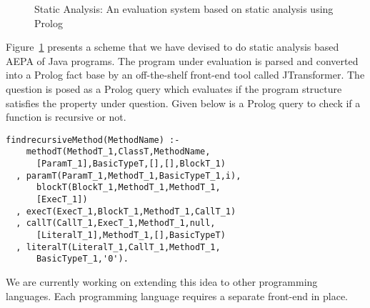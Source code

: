 \documentclass[12pt]{article}
\begin{document}
\begin{figure}

\begin{center}
\end{center}
\caption{Static Analysis: An evaluation system based on static analysis using Prolog}
\label{f:jtsa}
\end{figure}

Figure~\ref{f:jtsa} presents a scheme that we have devised to do static analysis based AEPA of Java programs. The program under evaluation is parsed and converted into a Prolog fact base by an off-the-shelf front-end tool called JTransformer. The question is posed as a Prolog query which evaluates if the program structure satisfies the property under question. Given below is a Prolog query to check if a function is recursive or not.

\begin{lstlisting}[style=pc]
findrecursiveMethod(MethodName) :-   
    methodT(MethodT_1,ClassT,MethodName,
      [ParamT_1],BasicTypeT,[],[],BlockT_1)
  ,	paramT(ParamT_1,MethodT_1,BasicTypeT_1,i), 
  	  blockT(BlockT_1,MethodT_1,MethodT_1,
  	  [ExecT_1])
  ,	execT(ExecT_1,BlockT_1,MethodT_1,CallT_1)
  ,	callT(CallT_1,ExecT_1,MethodT_1,null,
      [LiteralT_1],MethodT_1,[],BasicTypeT)
  ,	literalT(LiteralT_1,CallT_1,MethodT_1,
      BasicTypeT_1,'0').
\end{lstlisting}

We are currently working on extending this idea to other programming languages. Each programming language requires a separate front-end in place.
\end{document}
